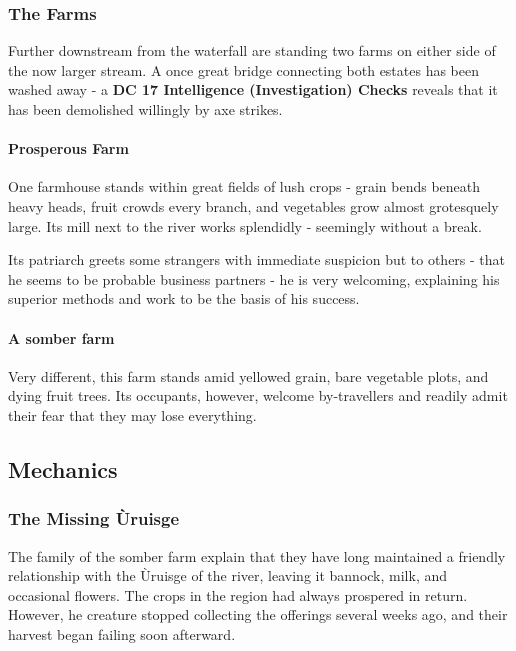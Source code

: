 \subsubsection*{The Farms}
{\entryfont Further downstream from the waterfall are standing two farms on either side of the now larger stream. A once great bridge connecting both estates has been washed away - a \textbf{DC 17 Intelligence (Investigation) Checks} reveals that it has been demolished willingly by axe strikes.

\paragraph*{Prosperous Farm} One farmhouse stands within great fields of lush crops - grain bends beneath heavy heads, fruit crowds every branch, and vegetables grow almost grotesquely large. Its mill next to the river works splendidly - seemingly without a break.

Its patriarch greets some strangers with immediate suspicion but to others - that he seems to be probable business partners - he is very welcoming, explaining his superior methods and work to be the basis of his success.

\paragraph*{A somber farm} Very different, this farm stands amid yellowed grain, bare vegetable plots, and dying fruit trees. Its occupants, however, welcome by-travellers and readily admit their fear that they may lose everything.}
\subsection*{Mechanics}
\subsubsection*{The Missing Ùruisge}
{\entryfont The family of the somber farm explain that they have long maintained a friendly relationship with the Ùruisge of the river, leaving it bannock, milk, and occasional flowers. The crops in the region had always prospered in return. However, he creature stopped collecting the offerings several weeks ago, and their harvest began failing soon afterward.}
